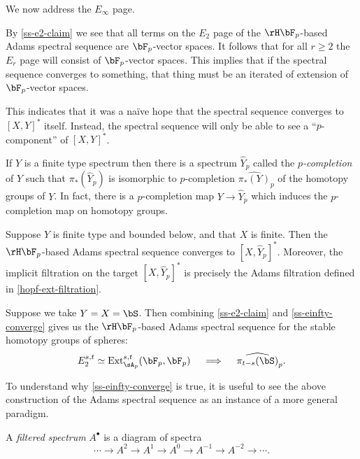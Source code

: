\begin{nothing}
  \label{ss-einfty}
  We now address the $E_\infty$ page.

  \begin{subremark}
    \label{ss-einfty-p}
    By \cref{ss-e2-claim} we see that all terms on the $E_2$ page of the $\HFp$-based Adams spectral sequence are $\bF_p$-vector spaces. It follows that for all $r \ge 2$ the $E_r$ page will consist of $\bF_p$-vector spaces. This implies that if the spectral sequence converges to something, that thing must be an iterated of extension of $\bF_p$-vector spaces.

    This indicates that it was a na\"ive hope that the spectral sequence converges to $[X,Y]^*$ itself. Instead, the spectral sequence will only be able to see a ``$p$-component'' of $[X,Y]^*$.
  \end{subremark}

  \begin{subdefinition}
    \label{ss-einfty-completion}
    If $Y$ is a finite type spectrum then there is a spectrum $\hat{Y}_p$ called the \emph{$p$-completion} of $Y$ such that $\pi_*(\hat{Y}_p)$ is isomorphic to $p$-completion $\hat{\pi_*(Y)}_p$ of the homotopy groups of $Y$. In fact, there is a $p$-completion map $Y \to \hat{Y}_p$ which induces the $p$-completion map on homotopy groups.
  \end{subdefinition}

  \begin{subclaim}
    \label{ss-einfty-converge}
    Suppose $Y$ is finite type and bounded below, and that $X$ is finite. Then the $\HFp$-based Adams spectral sequence converges to $[X,\hat{Y}_p]^*$. Moreover, the implicit filtration on the target $[X,\hat{Y}_p]^*$ is precisely the Adams filtration defined in \cref{hopf-ext-filtration}.
  \end{subclaim}

  \begin{subexample}
    \label{ss-einfty-homotopy}
    Suppose we take $Y = X = \bS$. Then combining \cref{ss-e2-claim} and \cref{ss-einfty-converge} gives us the $\HFp$-based Adams spectral sequence for the stable homotopy groups of spheres:
    \[
      E^{s,t}_2 \iso \Ext^{s,t}_{\sA_p}(\bF_p, \bF_p)
      \quad \implies \quad
      \hat{\pi_{t-s}(\bS)}_p.
    \]
  \end{subexample}
\end{nothing}

\begin{nothing}
  \label{ss-einfty-pf}
  To understand why \cref{ss-einfty-converge} is true, it is useful to see the above construction of the Adams spectral sequence as an instance of a more general paradigm.

  \begin{subdefinition}
    \label{ss-einfty-pf-filter}
    A \emph{filtered spectrum} $A^\bullet$ is a diagram of spectra
    \[
      \cdots \to A^2 \to A^1 \to A^0 \to A^{-1} \to A^{-2} \to \cdots .
    \]
    
  \end{subdefinition}  
\end{nothing}
  






